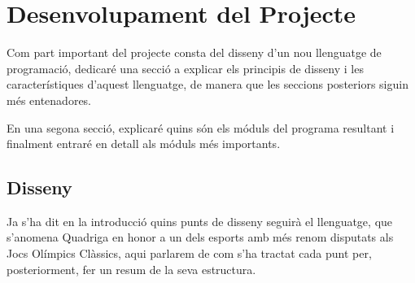 \chapter{Desenvolupament del Projecte}

Com part important del projecte consta del disseny d'un nou llenguatge de programació, dedicaré una secció a explicar els principis de disseny i les característiques d'aquest llenguatge, de manera que les seccions posteriors siguin més entenadores.

En una segona secció, explicaré quins són els móduls del programa resultant i finalment entraré en detall als móduls més importants.

\section{Disseny}

Ja s'ha dit en la introducció quins punts de disseny seguirà el llenguatge, que s'anomena Quadriga en honor a un dels esports amb més renom disputats als Jocs Olímpics Clàssics, aqui parlarem de com s'ha tractat cada punt per, posteriorment, fer un resum de la seva estructura.

